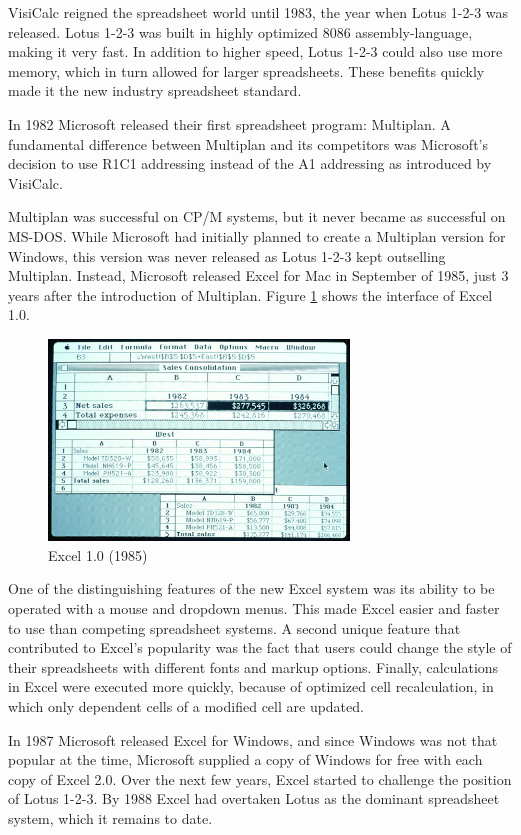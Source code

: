 VisiCalc reigned the spreadsheet world until 1983, the year when Lotus 1-2-3 was released. Lotus 1-2-3 was built in highly optimized 8086 assembly-language, making it very fast. In addition to higher speed, Lotus 1-2-3 could also use more memory, which in turn allowed for larger spreadsheets. These benefits quickly made it the new industry spreadsheet standard.

In 1982 Microsoft released their first spreadsheet program: Multiplan. A fundamental difference between Multiplan and its competitors was Microsoft's decision to use R1C1 addressing instead of the A1 addressing as introduced by VisiCalc. 

Multiplan was successful on CP/M systems, but it never became as successful on MS-DOS. While Microsoft had initially planned to create a Multiplan version for Windows, this version was never released as Lotus 1-2-3 kept outselling Multiplan. Instead, Microsoft released Excel for Mac in September of 1985, just 3 years after the introduction of Multiplan. Figure \ref{fig:Excel10} shows the interface of Excel 1.0.

\begin{figure}
  \begin{center}
  \includegraphics[width=8cm]{fig/excel10.png}
  \caption{Excel 1.0 (1985)}
  \label{fig:Excel10}
  \end{center}
\end{figure} 

One of the distinguishing features of the new Excel system was its ability to be operated with a mouse and dropdown menus. This made Excel easier and faster to use than competing spreadsheet systems. A second unique feature that contributed to Excel's popularity was the fact that users could change the style of their spreadsheets with different fonts and markup options. Finally, calculations in Excel were executed more quickly, because of optimized cell recalculation, in which only dependent cells of a modified cell are updated.

In 1987 Microsoft released Excel for Windows, and since Windows was not that popular at the time, Microsoft supplied a copy of Windows for free with each copy of Excel 2.0. Over the next few years, Excel started to challenge the position of Lotus 1-2-3. By 1988 Excel had overtaken Lotus as the dominant spreadsheet system, which it remains to date.